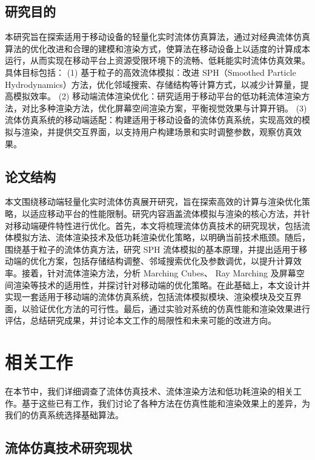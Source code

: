 \section{研究目的}

本研究旨在探索适用于移动设备的轻量化实时流体仿真算法，通过对经典流体仿真算法的优化改进和合理的建模和渲染方式，使算法在移动设备上以适度的计算成本运行，从而实现在移动平台上资源受限环境下的流畅、低耗能实时流体仿真效果。具体目标包括：
\newline
\indent (1) 基于粒子的高效流体模拟：改进 SPH（Smoothed Particle Hydrodynamics）方法，优化邻域搜索、存储结构等计算方式，以减少计算量，提高模拟效率。
\newline
\indent (2) 移动端流体渲染优化：研究适用于移动平台的低功耗流体渲染方法，对比多种渲染方法，优化屏幕空间渲染方案，平衡视觉效果与计算开销。
\newline
\indent (3) 流体仿真系统的移动端适配：构建适用于移动设备的流体仿真系统，实现高效的模拟与渲染，并提供交互界面，以支持用户构建场景和实时调整参数，观察仿真效果。


\section{论文结构}

本文围绕移动端轻量化实时流体仿真展开研究，旨在探索高效的计算与渲染优化策略，以适应移动平台的性能限制。研究内容涵盖流体模拟与渲染的核心方法，并针对移动端硬件特性进行优化。首先，本文将梳理流体仿真技术的研究现状，包括流体模拟方法、流体渲染技术及低功耗渲染优化策略，以明确当前技术瓶颈。随后，围绕基于粒子的流体仿真方法，研究 SPH 流体模拟的基本原理，并提出适用于移动端的优化方案，包括存储结构调整、邻域搜索优化及参数调优，以提升计算效率。接着，针对流体渲染方法，分析 Marching Cubes、 Ray Marching 及屏幕空间渲染等技术的适用性，并探讨针对移动端的优化策略。在此基础上，本文设计并实现一套适用于移动端的流体仿真系统，包括流体模拟模块、渲染模块及交互界面，以验证优化方法的可行性。最后，通过实验对系统的仿真性能和渲染效果进行评估，总结研究成果，并讨论本文工作的局限性和未来可能的改进方向。

\chapter{相关工作}

\indent 在本节中，我们详细调查了流体仿真技术、流体渲染方法和低功耗渲染的相关工作。基于这些已有工作，我们讨论了各种方法在仿真性能和渲染效果上的差异，为我们的仿真系统选择基础算法。

\section{流体仿真技术研究现状}

